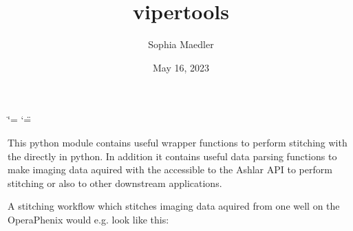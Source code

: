 \documentclass[a4paper,10pt,english,openany,oneside]{sphinxmanual}
\title{vipertools}
\date{May 16, 2023}
\author{Sophia Maedler}
\begin{document}
\ifdefined\shorthandoff
  \ifnum\catcode`\=\string=\active\shorthandoff{=}\fi
  \ifnum\catcode`\"=\active{}\fi
\fi

\pagestyle{empty}
\sphinxmaketitle
\pagestyle{plain}
\sphinxtableofcontents
\pagestyle{normal}
\label{\detokenize{index::doc}}


\sphinxAtStartPar
This python module contains useful wrapper functions to perform stitching with the  directly in python. In addition it contains
useful data parsing functions to make imaging data aquired with the  accessible to the Ashlar API to perform stitching
or also to other downstream applications.

\sphinxAtStartPar
A stitching workflow which stitches imaging data aquired from one well on the OperaPhenix would e.g. look like this:
\end{document}
